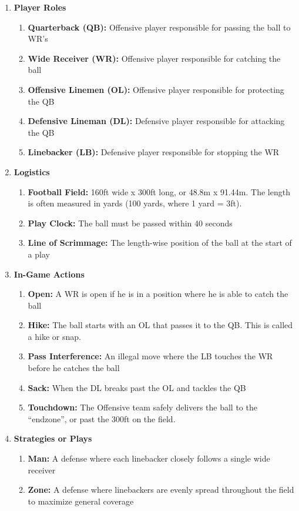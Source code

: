 \begin{enumerate}
    \item \textbf{Player Roles}
        \begin{enumerate}
            \item \textbf{Quarterback (QB):} Offensive player responsible for passing the ball to WR’s
            \item \textbf{Wide Receiver (WR):} Offensive player responsible for catching the ball 
            \item \textbf{Offensive Linemen (OL):} Offensive player responsible for protecting the QB 
            \item \textbf{Defensive Lineman (DL):} Defensive player responsible for attacking the QB
            \item \textbf{Linebacker (LB):} Defensive player responsible for stopping the WR
        \end{enumerate}
    \item \textbf{Logistics}
        \begin{enumerate}
            \item \textbf{Football Field:} 160ft wide x 300ft long, or 48.8m x 91.44m. The length is often measured in yards (100 yards, where 1 yard = 3ft). 
            \item \textbf{Play Clock:} The ball must be passed within 40 seconds
            \item \textbf{Line of Scrimmage:} The length-wise position of the ball at the start of a play
        \end{enumerate}
    \item \textbf{In-Game Actions}
        \begin{enumerate}
            \item \textbf{Open:} A WR is open if he is in a position where he is able to catch the ball
            \item \textbf{Hike:} The ball starts with an OL that passes it to the QB. This is called a hike or snap.
            \item \textbf{Pass Interference:} An illegal move where the LB touches the WR before he catches the ball 
            \item \textbf{Sack:} When the DL breaks past the OL and tackles the QB
            \item \textbf{Touchdown:} The Offensive team safely delivers the ball to the “endzone”, or past the 300ft on the field.
        \end{enumerate}
    \item \textbf{Strategies or Plays}
        \begin{enumerate}
            \item \textbf{Man:} A defense where each linebacker closely follows a single wide receiver
            \item \textbf{Zone:} A defense where linebackers are evenly spread throughout the field to maximize general coverage
        \end{enumerate}
\end{enumerate}


